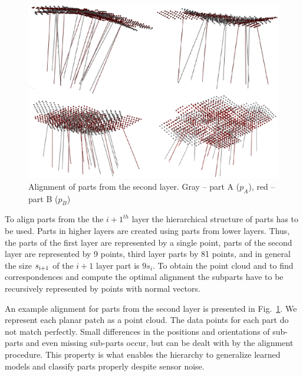 \documentclass[letterpaper,10pt,conference]{ieeeconf}  %
\begin{document}
\begin{figure}[t]
 \centering
 \includegraphics[width=0.95\columnwidth]{../images/parts2ndLayer.eps}
 \caption{Alignment of parts from the second layer. Gray -- part A ($p_A$), red -- part B ($p_B$)}
 \label{parts2ndLayer}
\end{figure}

To align parts from the the $i+1^{th}$ layer the hierarchical structure of parts has to be used. Parts in higher layers are created using parts from lower layers. Thus, the parts of the first layer are represented by a single point, parts of the second layer are represented by 9 points, third layer parts by 81 points, and in general the size $s_{\rm i+1}$ of the $i+1$ layer part is $9s_i$. To obtain the point cloud and to find correspondences and compute the optimal alignment the subparts have to be recursively represented by points with normal vectors.

An example alignment for parts from the second layer is presented in Fig.~\ref{parts2ndLayer}. We represent each planar patch as a point cloud. The data points for each part do not match perfectly. Small differences in the positions and orientations of sub-parts and even missing sub-parts occur, but can be dealt with by the alignment procedure. This property is what enables the hierarchy to generalize learned models and classify parts properly despite sensor noise.
\end{document}
